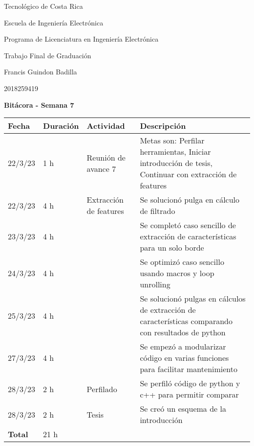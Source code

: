 \documentclass[12pt,oneside]{book}
\begin{document}
 \graphicspath{{./}{../tesis/fig/}}
  Tecnológico de Costa Rica
  \par\vspace{1mm}
  Escuela de Ingeniería Electrónica
  \par\vspace{1mm}
  Programa de Licenciatura en Ingeniería Electrónica
  \par\vspace{10mm}
  Trabajo Final de Graduación
  \par\vspace{1mm}
  Francis Guindon Badilla
  \par\vspace{1mm}
  2018259419
  \par\vspace{10mm}
  \large\textbf{Bitácora - Semana 7}
  \par\vspace{10mm}
  \small

  \begin{table} [!h]
    \centering
    \small
    \begin{tabular}{p{1.5 cm} p{2.1 cm} p{5 cm} p{8 cm}}
      \hline
      Fecha & Duración & Actividad & Descripción \\
      \hline
      22/3/23 & 1 h & Reunión de avance 7 & Metas son: Perfilar herramientas, Iniciar introducción de tesis, Continuar con extracción de features \\
      22/3/23 & 4 h & Extracción de features & Se solucionó pulga en cálculo de filtrado \\
      23/3/23 & 4 h & & Se completó caso sencillo de extracción de características para un solo borde \\
      24/3/23 & 4 h & & Se optimizó caso sencillo usando macros y loop unrolling \\
      25/3/23 & 4 h & & Se solucionó pulgas en cálculos de extracción de características comparando con resultados de python \\
      27/3/23 & 4 h & & Se empezó a modularizar código en varias funciones para facilitar mantenimiento \\
      28/3/23 & 2 h & Perfilado & Se perfiló código de python y c++ para permitir comparar \\
      28/3/23 & 2 h & Tesis & Se creó un esquema de la introducción \\
      \hline
      \textbf{Total} & 21 h \\
      \hline
    \end{tabular}
  \end{table}
  
\end{document}
